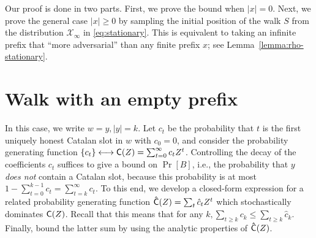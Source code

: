   Our proof is done in two parts. First, we prove the bound when $|x| = 0$. 
  Next, we prove the general case $|x| \geq 0$ 
  by sampling the initial position of the walk $S$ 
  from the distribution $\mathcal{X}_\infty$ in \eqref{eq:stationary}. 
  This is equivalent to taking an infinite prefix that ``more adversarial'' 
  than any finite prefix $x$; see Lemma~\ref{lemma:rho-stationary}.




\section{Walk with an empty prefix}\label{sec:catalan-estimates}




  In this case, we write $w = y, |y| = k$. 
  Let $c_t$ be the probability that $t$ is the first uniquely honest Catalan slot in $w$ 
  with $c_0 = 0$, and consider the probability generating function 
  $\{c_t\} \longleftrightarrow \mathsf{C}(Z) = \sum_{t = 0}^\infty c_t Z^t$. 
  Controlling the decay of the coefficients $c_t$ suffices
  to give a bound on $\Pr[B]$, i.e., 
  the probability that 
  $y$ \emph{does not} contain a Catalan slot, 
  because this probability is at most 
  $
    1 - \sum_{t =0}^{k-1} c_t 
      = \sum_{t = k}^\infty c_t
  $. 
  To this end, we develop a
  closed-form expression for a related probability generating function
  $\mathsf{\hat{C}}(Z) = \sum_t \hat{c}_t Z^t$ which stochastically
  dominates $\mathsf{C}(Z)$. 
  Recall that this means that for any $k, \sum_{t \geq k} c_k \leq \sum_{t \geq k} \hat{c}_k$. 
  Finally, bound the latter sum  
  by using the analytic properties of $\mathsf{\hat{C}}(Z)$. 

